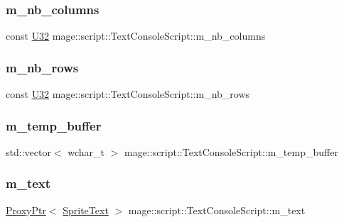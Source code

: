 \subsubsection{\texorpdfstring{m\+\_\+nb\+\_\+columns}{m\_nb\_columns}}
{\footnotesize\ttfamily const \hyperlink{namespacemage_a41c104c036fba3756a74e19f793eeaa1}{U32} mage\+::script\+::\+Text\+Console\+Script\+::m\+\_\+nb\+\_\+columns\hspace{0.3cm}{\ttfamily [private]}}

\hypertarget{classmage_1_1script_1_1_text_console_script_a9d00451cf1cf319512e0c88352d22911}{}\label{classmage_1_1script_1_1_text_console_script_a9d00451cf1cf319512e0c88352d22911} 
\subsubsection{\texorpdfstring{m\+\_\+nb\+\_\+rows}{m\_nb\_rows}}
{\footnotesize\ttfamily const \hyperlink{namespacemage_a41c104c036fba3756a74e19f793eeaa1}{U32} mage\+::script\+::\+Text\+Console\+Script\+::m\+\_\+nb\+\_\+rows\hspace{0.3cm}{\ttfamily [private]}}

\hypertarget{classmage_1_1script_1_1_text_console_script_ae62bf3d6f88f297eb37892d507d8a032}{}\label{classmage_1_1script_1_1_text_console_script_ae62bf3d6f88f297eb37892d507d8a032} 
\subsubsection{\texorpdfstring{m\+\_\+temp\+\_\+buffer}{m\_temp\_buffer}}
{\footnotesize\ttfamily std\+::vector$<$ wchar\+\_\+t $>$ mage\+::script\+::\+Text\+Console\+Script\+::m\+\_\+temp\+\_\+buffer\hspace{0.3cm}{\ttfamily [private]}}

\hypertarget{classmage_1_1script_1_1_text_console_script_a227a1a94f00552c267b7d3f3516676d6}{}\label{classmage_1_1script_1_1_text_console_script_a227a1a94f00552c267b7d3f3516676d6} 
\subsubsection{\texorpdfstring{m\+\_\+text}{m\_text}}
{\footnotesize\ttfamily \hyperlink{classmage_1_1_proxy_ptr}{Proxy\+Ptr}$<$ \hyperlink{classmage_1_1_sprite_text}{Sprite\+Text} $>$ mage\+::script\+::\+Text\+Console\+Script\+::m\+\_\+text\hspace{0.3cm}{\ttfamily [private]}}

